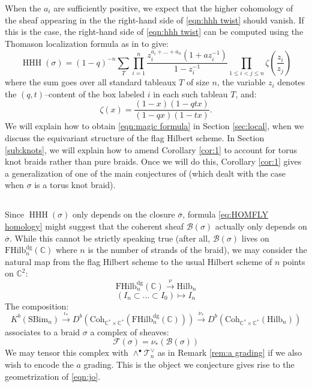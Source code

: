 \documentclass[12pt]{amsart}
\numberwithin{equation}{section}
\theoremstyle{definition}
\theoremstyle{remark}
\DeclareMathOperator{\HHH}{HHH}
\newcommand{\CC}{\mathbb{C}}
\newcommand{\CB}{\mathcal{B}}
\newcommand{\CF}{\mathcal{F}}
\newcommand{\CT}{\mathcal{T}}
\renewcommand{\1}{\mathbf{1}}
\newcommand{\coh}{\mathrm{Coh}}
\newcommand{\FH}{\mathrm{FHilb}}
\renewcommand{\H}{\mathrm{Hilb}}
\newcommand{\SBim}{\mathrm{SBim}}
\newcommand{\torus}{\CC^{*} \times \CC^*}
\newcommand{\dg}{\text{dg}}%
\begin{document}
When the \(a_i\) are sufficiently positive, we expect that the higher cohomology of the sheaf appearing in the the right-hand side of \eqref{eqn:hhh twist} should vanish. If this is the case, the right-hand side of \eqref{eqn:hhh twist} can be computed using  the Thomason localization formula as in \cite{GN} to give:
\begin{equation}
\label{eqn:magic formula}
\HHH(\sigma) =(1-q)^{-n}\sum_{T}\prod_{i=1}^{n}\frac{z_i^{a_i+\ldots+a_n}(1+az_i^{-1})}{1-z_i^{-1}} \prod_{1\leq i<j \leq n} \zeta \left(\frac {z_i}{z_j}\right)
\end{equation}
where the sum goes over all standard tableaux $T$ of size $n$, the variable $z_i$ denotes the $(q,t)$--content of the box labeled $i$ in each such tableau $T$, and:
$$
\zeta(x)=\frac{(1-x)(1-qtx)}{(1-qx)(1-tx)}.
$$
We will explain how to obtain \eqref{eqn:magic formula} in Section \ref{sec:local}, when we discuss the equivariant structure of the flag Hilbert scheme. In Section \ref{sub:knots}, we will explain how to amend Corollary \ref{cor:1} to account for torus knot braids rather than pure braids. Once we will do this, Corollary \ref{cor:1} gives a generalization of one of the main conjectures of \cite{GN} (which dealt with the case when $\sigma$ is a torus knot braid).

\subsection{}

Since $\HHH(\sigma)$ only depends on the closure $\overline{\sigma}$, formula \eqref{eq:HOMFLY homology} might suggest that the coherent sheaf $\CB(\sigma)$ actually only depends on $\overline{\sigma}$. While this cannot be strictly speaking true (after all, $\CB(\sigma)$ lives on $\FH_n^\dg(\CC)$ where $n$ is the number of strands of the braid), we may consider the natural map from the flag Hilbert scheme to the usual Hilbert scheme of $n$ points on $\CC^2$:
$$
\FH_n^\dg(\CC) \stackrel{\nu}\longrightarrow \H_n
$$
\begin{equation}
\label{eqn:map to hilb}
\left( I_n \subset ... \subset I_0 \right) \mapsto I_n
\end{equation}
The composition:
$$
K^b(\SBim_n) \xrightarrow{\iota_*} D^b \left(\coh_{\torus} \left(\FH_n^\dg(\CC) \right) \right) \xrightarrow{\nu_*} D^b \left(\coh_{\torus} \left(\H_n \right) \right)
$$
associates to a braid $\sigma$ a complex of sheaves:
\begin{equation}
\label{eqn:sheaf on hilb}
\CF(\sigma) = \nu_*(\CB(\sigma))
\end{equation}
We may tensor this complex with $\wedge^\bullet \CT_n^\vee$ as in Remark \ref{rem:a grading} if we also wish to encode the $a$ grading. This is the object we conjecture gives rise to the geometrization of \eqref{eqn:jo}.
\end{document}
